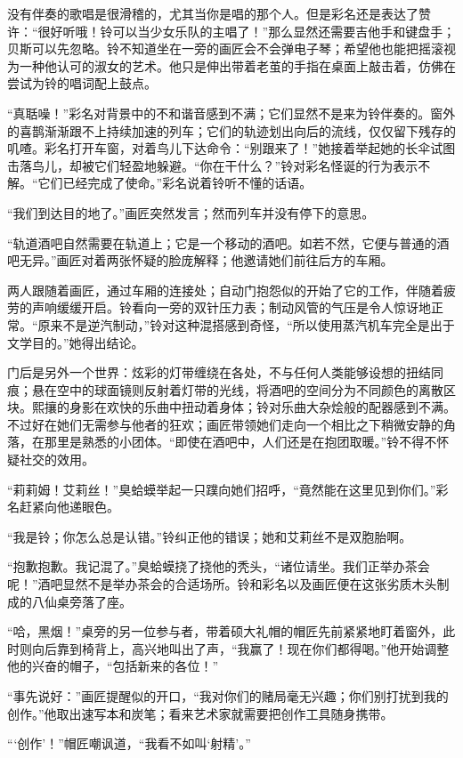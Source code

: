 没有伴奏的歌唱是很滑稽的，尤其当你是唱的那个人。但是彩名还是表达了赞许：“很好听哦！铃可以当少女乐队的主唱了！”那么显然还需要吉他手和键盘手；贝斯可以先忽略。铃不知道坐在一旁的画匠会不会弹电子琴；希望他也能把摇滚视为一种他认可的淑女的艺术。他只是伸出带着老茧的手指在桌面上敲击着，仿佛在尝试为铃的唱词配上鼓点。

“真聒噪！”彩名对背景中的不和谐音感到不满；它们显然不是来为铃伴奏的。窗外的喜鹊渐渐跟不上持续加速的列车；它们的轨迹划出向后的流线，仅仅留下残存的叽喳。彩名打开车窗，对着鸟儿下达命令：“别跟来了！”她接着举起她的长伞试图击落鸟儿，却被它们轻盈地躲避。“你在干什么？”铃对彩名怪诞的行为表示不解。“它们已经完成了使命。”彩名说着铃听不懂的话语。

“我们到达目的地了。”画匠突然发言；然而列车并没有停下的意思。

“轨道酒吧自然需要在轨道上；它是一个移动的酒吧。如若不然，它便与普通的酒吧无异。”画匠对着两张怀疑的脸庞解释；他邀请她们前往后方的车厢。

两人跟随着画匠，通过车厢的连接处；自动门抱怨似的开始了它的工作，伴随着疲劳的声响缓缓开启。铃看向一旁的双针压力表；制动风管的气压是令人惊讶地正常。“原来不是逆汽制动，”铃对这种混搭感到奇怪，“所以使用蒸汽机车完全是出于文学目的。”她得出结论。

门后是另外一个世界：炫彩的灯带缠绕在各处，不与任何人类能够设想的扭结同痕；悬在空中的球面镜则反射着灯带的光线，将酒吧的空间分为不同颜色的离散区块。熙攘的身影在欢快的乐曲中扭动着身体；铃对乐曲大杂烩般的配器感到不满。不过好在她们无需参与他者的狂欢；画匠带领她们走向一个相比之下稍微安静的角落，在那里是熟悉的小团体。“即使在酒吧中，人们还是在抱团取暖。”铃不得不怀疑社交的效用。

“莉莉姆！艾莉丝！”臭蛤蟆举起一只蹼向她们招呼，“竟然能在这里见到你们。”彩名赶紧向他递眼色。

“我是铃；你怎么总是认错。”铃纠正他的错误；她和艾莉丝不是双胞胎啊。

“抱歉抱歉。我记混了。”臭蛤蟆挠了挠他的秃头，“诸位请坐。我们正举办茶会呢！”酒吧显然不是举办茶会的合适场所。铃和彩名以及画匠便在这张劣质木头制成的八仙桌旁落了座。

“哈，黑烟！”桌旁的另一位参与者，带着硕大礼帽的帽匠先前紧紧地盯着窗外，此时则向后靠到椅背上，高兴地叫出了声，“我赢了！现在你们都得喝。”他开始调整他的兴奋的帽子，“包括新来的各位！”

“事先说好：”画匠提醒似的开口，“我对你们的赌局毫无兴趣；你们别打扰到我的创作。”他取出速写本和炭笔；看来艺术家就需要把创作工具随身携带。

“‘创作’！”帽匠嘲讽道，“我看不如叫‘射精’。”

